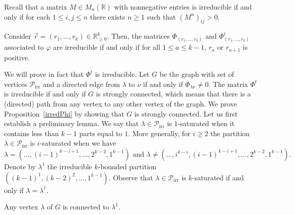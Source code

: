 \documentclass[ALCO,ThmDefs,Unicode,epreuves]{cedram}
\DeclareMathOperator{\irr}{irr}
\begin{document}
Recall that a matrix $M\in M_{n}(\mathbb{R})$ with nonnegative entries is
irreducible if and only if for each $1\leq i,j\leq n$ there exists $n\geq1$
such that $(M^{n})_{ij}>0$.

\begin{prop}
\label{irredPhi}Consider $\vec{r}=(r_{1},\ldots,r_{k})\in\mathbb{R}_{\geq
0}^{k}.$ Then, the matrices $\Phi_{(r_{1},\ldots,r_{k})}$ and $\Phi
_{(r_{1},\ldots,r_{k})}^{t}$ associated to $\varphi$ are irreducible if and
only if for all $1\leq a\leq k-1$, $r_{a}$ or $r_{a+1}$ is positive.
\end{prop}

We will prove in fact that $\Phi^{t}$ is irreducible. Let $G$ be the graph
with set of vertices $\mathcal{P}_{\irr }$ and a directed edge from
$\lambda$ to $\nu$ if and only if $\Phi_{\lambda\nu}\not =0$. The matrix
$\Phi^{t}$ is irreducible if and only if $G$ is strongly connected, which
means that there is a (directed) path from any vertex to any other vertex of
the graph. We prove Proposition~\ref{irredPhi} by showing that $G$ is strongly
connected. Let us first establish a preliminary lemma. We say that $\lambda
\in\mathcal{P}_{\irr }$ is $1$-saturated when it contains less than
$k-1$ parts equal to $1$. More generally, for $i\geq2$ the partition
$\lambda\in\mathcal{P}_{\irr }$ is $i$-saturated when we have%
\[
\lambda=(\ldots,(i-1)^{k-i+1},\dots,2^{k-2},1^{k-1})\text{ and }\lambda
\neq(\ldots,i^{k-i},(i-1)^{k-i+1},\dots,2^{k-2},1^{k-1}).
\]
Denote by $\lambda^{1}$ the irreducible $k$-bounded partition $((k-1)^{1}%
,(k-2)^{2},\dots,1^{k-1})$. Observe that $\lambda\in\mathcal{P}_{\irr %
}$ is $k$-saturated if and only if $\lambda=\lambda^{1}$.

\begin{lemma}
Any vertex $\lambda$ of $G$ is connected to $\lambda^{1}$.
\end{lemma}
\end{document}
